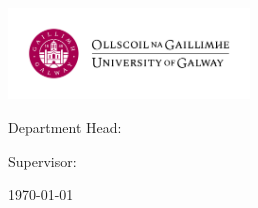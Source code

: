 \pagestyle{empty}
\begin{center}

\centerline{\mbox{\includegraphics[width=64mm]{assets/Logo_UoG.pdf}}}

\bigskip

{\large \ThesisUniversity}

{\ThesisDept}

Department Head: {\ThesisDeptHead}

\vspace{2cm}

{\bfseries\Huge \ThesisTitle}

\smallskip

{\bfseries\LARGE \ThesisSubTitle}

\medskip

\vspace{1cm}

{\bfseries\large \ThesisAuthor}

{\large Supervisor: \ThesisAdvisor}

\vfill

{\large \ThesisPurpose}

\medskip

{\large \ThesisDegree}

\vspace{1cm}

\today
{}

\end{center}

\cleardoublepage

\pagestyle{fancy}
